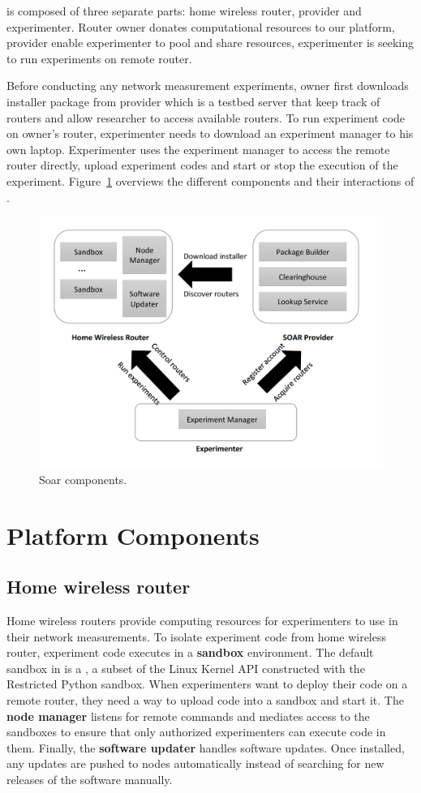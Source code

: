 \sysname is composed of three separate parts: home wireless router, \sysname provider and experimenter. Router owner donates computational resources to our platform, \sysname provider enable experimenter to pool and share resources, experimenter is seeking to run experiments on remote router.

Before conducting any network measurement experiments, owner first downloads installer package from \sysname provider which is a testbed server that keep track of routers and allow researcher to access available routers. To run experiment code on owner's router, experimenter needs to download an experiment manager to his own laptop. Experimenter uses the experiment manager to access the remote router directly, upload experiment codes and start or stop the execution of the experiment. Figure~\ref{fig-arch} overviews the different components and their interactions of \sysname.

\begin{figure}%
\centering
\includegraphics[width=0.8\columnwidth]{figure/soar-arch.png}
\caption{Soar components.}
\label{fig-arch}
\end{figure}

\section{Platform Components}
\subsection{Home wireless router}
Home wireless routers provide computing resources for experimenters to use in their network measurements. To isolate experiment code from home wireless router, experiment code executes in a \textbf{sandbox} environment. The default sandbox in \sysname is a \sandboxname, a subset of the Linux Kernel API constructed with the Restricted Python sandbox. When experimenters want to deploy their code on a remote router, they need a way to upload code into a sandbox and start it. The \textbf{node manager} listens for remote commands and mediates access to the sandboxes to ensure that only authorized experimenters can execute code in them. Finally, the \textbf{software updater} handles software updates. Once installed, any updates are pushed to nodes automatically instead of searching for new releases of the software manually.  
